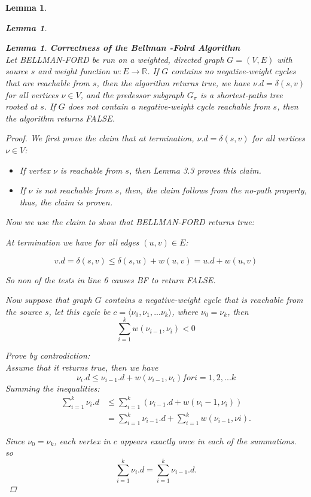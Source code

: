 \documentclass[a4paper,11pt]{book}
\newtheorem{lemma}[theorem]{Lemma}
\begin{document}
{\begin{lemma}
\begin{lemma}
\begin{lemma}\textbf{Correctness of the Bellman -Folrd Algorithm}\\
Let BELLMAN-FORD be run on a weighted, directed graph $G=(V,E)$ with source $s$ and weight function $w : E \rightarrow \mathbb{R}$. If $G$ contains no negative-weight cycles that are reachable from $s$, then the algorithm returns true, we have $\nu.d = \delta(s,v)$ for all vertices $\nu \in V$, and the predessor subgraph $G_\pi$ is a shortest-paths tree rooted at $s$. If $G$ does not contain a negative-weight cycle reachable from $s$, then the algorithm returns FALSE.
\end{lemma}
\begin{proof}
We first prove the claim that at termination, $\nu.d = \delta(s,v)$ for all vertices $\nu \in V$:
\begin{itemize}
\item If vertex $\nu$ is reachable from $s$, then Lemma 3.3 proves this claim.
\item If $\nu$ is not reachable from $s$, then, the claim follows from the no-path property, thus, the claim is proven.
\end{itemize}
Now we use the claim to show that BELLMAN-FORD returns true:

At termination we have for all edges $(u,v) \in E$:

\[v.d = \delta(s,v) \leq \delta(s, u)+w(u, v) = u.d +w(u, v) \]

So non of the tests in line 6 causes BF to return FALSE.

Now suppose that graph $G$ contains a negative-weight cycle that is reachable from the source $s$, let this cycle be $c = \langle \nu_0, \nu_1,... \nu_k \rangle$, where $\nu_0 = \nu_k$, then
\begin{equation}
\sum_{i=1}^k w(\nu_{i-1}, \nu_i) <0
\end{equation}

Prove by controdiction:\\
Assume that it returns true, then we have \[\nu_i.d \leq \nu_{i-1}.d + w(\nu_{i-1}, \nu_i) for i = 1, 2, ...k\]
Summing the inequalities:
\[\begin{split}
\sum^k_{i=1} \nu_i.d &\leq \sum^k_{i=1}(\nu_{i-1}.d + w(\nu_i-1,\nu_i))\\
                     &= \sum_{i=1}^k \nu_{i-1}.d +\sum^k_{i=1} w (\nu_{i-1},\nu{i}).
\end{split}\]

Since $\nu_0 = \nu_k$, each vertex in $c$ appears exactly once in each of the summations. so\[\sum_{i=1}^k \nu_i.d = \sum^k_{i=1} \nu_{i-1}.d.\]


\end{proof}
\end{lemma}
\end{lemma}}
\end{document}
